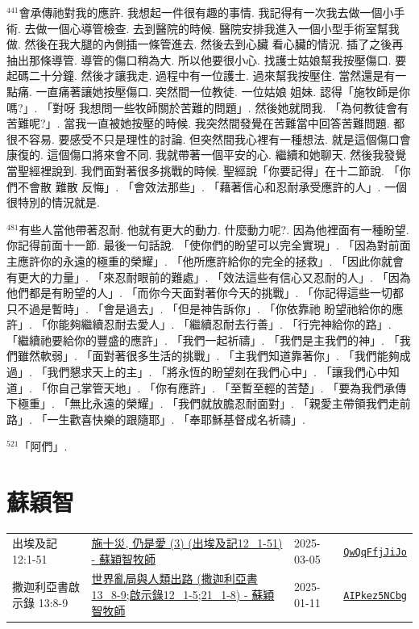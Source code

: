 \documentclass{book}
\begin{document}
$^{441}$會承傳祂對我的應許.
我想起一件很有趣的事情.
我記得有一次我去做一個小手術.
去做一個心導管檢查.
去到醫院的時候.
醫院安排我進入一個小型手術室幫我做.
然後在我大腿的內側插一條管進去.
然後去到心臟 看心臟的情況.
插了之後再抽出那條導管.
導管的傷口稍為大.
所以他要很小心.
找護士姑娘幫我按壓傷口.
要起碼二十分鐘.
然後才讓我走.
過程中有一位護士.
過來幫我按壓住.
當然還是有一點痛.
一直痛著讓她按壓傷口.
突然間一位教徒.
一位姑娘 姐妹.
認得「施牧師是你嗎?」.
「對呀 我想問一些牧師關於苦難的問題」.
然後她就問我.
「為何教徒會有苦難呢?」.
當我一直被她按壓的時候.
我突然間發覺在苦難當中回答苦難問題.
都很不容易.
要感受不只是理性的討論.
但突然間我心裡有一種想法.
就是這個傷口會康復的.
這個傷口將來會不同.
我就帶著一個平安的心.
繼續和她聊天.
然後我發覺當聖經裡說到.
我們面對著很多挑戰的時候.
聖經說「你要記得」在十二節說.
「你們不會散 難散 反悔」.
「會效法那些」.
「藉著信心和忍耐承受應許的人」.
一個很特別的情況就是.

$^{481}$有些人當他帶著忍耐.
他就有更大的動力.
什麼動力呢?.
因為他裡面有一種盼望.
你記得前面十一節.
最後一句話說.
「使你們的盼望可以完全實現」.
「因為對前面主應許你的永遠的極重的榮耀」.
「他所應許給你的完全的拯救」.
「因此你就會有更大的力量」.
「來忍耐眼前的難處」.
「效法這些有信心又忍耐的人」.
「因為他們都是有盼望的人」.
「而你今天面對著你今天的挑戰」.
「你記得這些一切都只不過是暫時」.
「會是過去」.
「但是神告訴你」.
「你依靠祂 盼望祂給你的應許」.
「你能夠繼續忍耐去愛人」.
「繼續忍耐去行善」.
「行完神給你的路」.
「繼續祂要給你的豐盛的應許」.
「我們一起祈禱」.
「我們是主我們的神」.
「我們雖然軟弱」.
「面對著很多生活的挑戰」.
「主我們知道靠著你」.
「我們能夠成過」.
「我們懇求天上的主」.
「將永恆的盼望刻在我們心中」.
「讓我們心中知道」.
「你自己掌管天地」.
「你有應許」.
「至暫至輕的苦楚」.
「要為我們承傳下極重」.
「無比永遠的榮耀」.
「我們就放膽忍耐面對」.
「親愛主帶領我們走前路」.
「一生歡喜快樂的跟隨耶」.
「奉耶穌基督成名祈禱」.

$^{521}$「阿們」.
\newpage



\chapter{蘇穎智}\label{ch:preacher10}
\begin{multicols}{3}
\minitoc
\end{multicols}
{ \scriptsize


\begin{xltabular}{\textwidth}{|p{0.15\textwidth} p{0.6\textwidth}|p{0.07\textwidth} p{0.1\textwidth}|}
\hline
出埃及記 12:1-51 & \hyperref[sec:QwQqFfjJiJo]{施十災, 仍是愛 (3) (出埃及記12\_1-51) -  蘇穎智牧師} & 2025-03-05 & \href{https://youtube.com/watch?v=QwQqFfjJiJo}{\texttt{QwQqFfjJiJo}} \\
撒迦利亞書啟示錄 13:8-9 & \hyperref[sec:AIPkez5NCbg]{世界亂局與人類出路 (撒迦利亞書13\_8-9;啟示錄12\_1-5;21\_1-8) -  蘇穎智牧師} & 2025-01-11 & \href{https://youtube.com/watch?v=AIPkez5NCbg}{\texttt{AIPkez5NCbg}} \\
\hline
\end{xltabular}
}
\newpage
\end{document}
